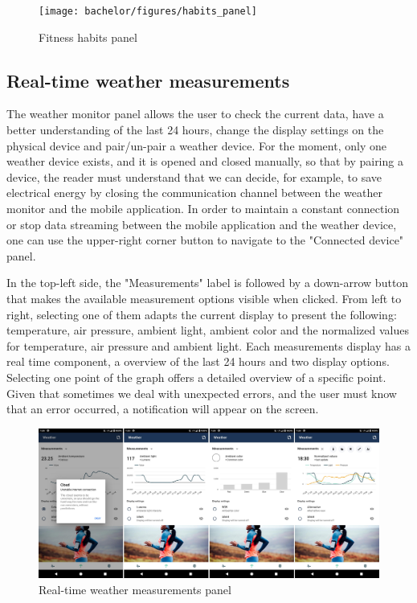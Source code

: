 \begin{figure}[!htb]
    \centering
    \texttt{[image: bachelor/figures/habits\_panel]}
    \caption{Fitness habits panel}
    \label{fig:fitness_habits_panel}
\end{figure}

\subsection{Real-time weather measurements}

The weather monitor panel allows the user to check the current data, have a better understanding of the last 24 hours, change the display settings on the physical device and pair/un-pair a weather device. For the moment, only one weather device exists, and it is opened and closed manually, so that by pairing a device, the reader must understand that we can decide, for example, to save electrical energy by closing the communication channel between the weather monitor and the mobile application. In order to maintain a constant connection or stop data streaming between the mobile application and the weather device, one can use the upper-right corner button to navigate to the "Connected device" panel.

In the top-left side, the "Measurements" label is followed by a down-arrow button that makes the available measurement options visible when clicked. From left to right, selecting one of them adapts the current display to present the following: temperature, air pressure, ambient light, ambient color and the normalized values for temperature, air pressure and ambient light. Each measurements display has a real time component, a overview of the last 24 hours and two display options. Selecting one point of the graph offers a detailed overview of a specific point. Given that sometimes we deal with unexpected errors, and the user must know that an error occurred, a notification will appear on the screen.

\begin{figure}[!htb]
    \centering
    \includegraphics[width = 15.5cm]{figures/monitor_view}
    \caption{Real-time weather measurements panel}
    \label{fig:real_time_weather_measurements_panel}
\end{figure}

